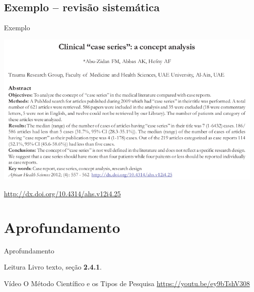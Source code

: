 \documentclass{beamer}
\begin{document}

\subsection{Exemplo -- revisão sistemática}

\begin{frame}{Exemplo}
  \begin{exampleblock}{}
    \begin{center}
      \includegraphics[width=\textwidth]{Metodos/case-series}

      \bigskip
      \tiny \url{http://dx.doi.org/10.4314/ahs.v12i4.25}
    \end{center}
  \end{exampleblock}
\end{frame}

\section{Aprofundamento}

\begin{frame}{Aprofundamento}
  \begin{block}{Leitura}
    Livro texto, seção {\bf 2.4.1}.
  \end{block}
  \begin{block}{Vídeo}
    O Método Científico e os Tipos de Pesquisa \href{https://youtu.be/ey9bTshV308}{https://youtu.be/ey9bTshV308}
  \end{block}

\end{frame}
\end{document}
